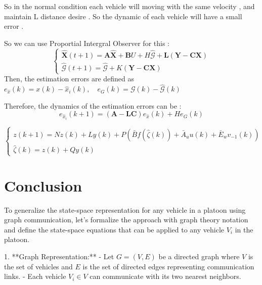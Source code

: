 \documentclass[letterpaper, 10pt, conference]{ieeeconf}  %
\begin{document}
So in the normal condition each vehicle will moving with the same velocity , and maintain L distance desire . So the dynamic of each vehicle will have a small error . 

So we can use Proportial Intergral Observer for this : 
\begin{equation}\label{obser_global}
    \left\{ \begin{array}{l}
        \mathbf{\hat{X}}(t+1)=\mathbf{A} \mathbf{\hat{X}} + \mathbf{B} U + H\mathcal{\hat{G}} + \mathbf{L}(\mathbf{Y} - \mathbf{C}\mathbf{X} )
        \\ 
         \mathcal{\hat{G}}(t+1) =\mathcal{\hat{G}} +  K(\mathbf{Y} - \mathbf{C}\mathbf{X})
     \end{array}\right.
\end{equation}
 Then, the estimation errors are defined as
 $e_{\hat{x}} (k) = x(k) - \hat{x}_i (k), \quad e_G (k) = \mathcal{G}(k) - \hat{\mathcal{G}} (k) $
 
 Therefore, the dynamics of the estimation errors can be : 
\begin{equation}
    e_{\hat{x}_i} (k + 1) = (\mathbf{A} -\mathbf{LC}) e_{\hat{x}} (k) + He_G (k)
\end{equation}


\begin{equation}
 {\left\{ \begin{array}{l}\label{obs}
    z(k+1) = N z(k) + L y(k) + P (\bar{B} f(\hat{\zeta}(k)) + \bar{A}_{u} u(k) + \bar{E}_w v_{-1}(k)) \\
    \hat{\zeta}(k) = z(k) + Q y(k)
 \end{array}\right.}
\end{equation}

\section{Conclusion}

To generalize the state-space representation for any vehicle in a platoon using graph communication, let's formalize the approach with graph theory notation and define the state-space equations that can be applied to any vehicle \( V_i \) in the platoon.


1. **Graph Representation:**
   - Let \( G = (V, E) \) be a directed graph where \( V \) is the set of vehicles and \( E \) is the set of directed edges representing communication links.
   - Each vehicle \( V_i \in V \) can communicate with its two nearest neighbors.
\end{document}
